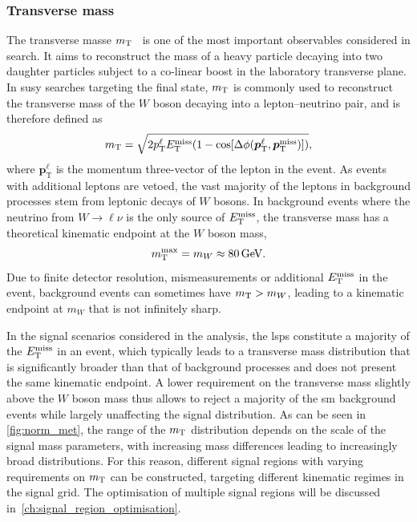 \subsubsection{Transverse mass}

The transverse masse $m_{\textrm{T}}$~\cite{Arnison:1983rp,transversemass:163856} is one of the most important observables considered in \onelepton search. It aims to reconstruct the mass of a heavy particle decaying into two daughter particles subject to a co-linear boost in the laboratory transverse plane. In \gls{susy} searches targeting the \onelepton final state, $m_{\textrm{T}}$ is commonly used to reconstruct the transverse mass of the $W$ boson decaying into a lepton--neutrino pair, and is therefore defined as
\begin{equation}
	m_{\textrm{T}} = \sqrt{2p_{\textrm{T}}^\ell E_{\textrm{T}}^{\textrm{miss}}(1-\cos[\Delta\phi(\boldsymbol{p}_\mathrm{T}^\ell,\boldsymbol{p}_\mathrm{T}^\mathrm{miss})])},
\end{equation}
where $\boldsymbol{p}_\mathrm{T}^\ell$ is the momentum three-vector of the lepton in the event. As events with additional leptons are vetoed, the vast majority of the leptons in background processes stem from leptonic decays of $W$ bosons. In background events where the neutrino from $W\rightarrow\ell\nu$ is the only source of $E_{\textrm{T}}^{\textrm{miss}}$, the transverse mass has a theoretical kinematic endpoint at the $W$ boson mass, 
\begin{equation}
	\mt^\mathrm{max} = m_W \approx \SI{80}{\GeV}.
\end{equation}
Due to finite detector resolution, mismeasurements or additional $E_{\textrm{T}}^{\textrm{miss}}$ in the event, background events can sometimes have $m_{\textrm{T}} > m_W$, leading to a kinematic endpoint at $m_W$ that is not infinitely sharp.

In the signal scenarios considered in the analysis, the \glspl{lsp} constitute a majority of the $E_{\textrm{T}}^{\textrm{miss}}$ in an event, which typically leads to a transverse mass distribution that is significantly broader than that of background processes and does not present the same kinematic endpoint. A lower requirement on the transverse mass slightly above the $W$ boson mass thus allows to reject a majority of the \gls{sm} background events while largely unaffecting the signal distribution. As can be seen in \cref{fig:norm_met}, the range of the $m_{\textrm{T}}$ distribution depends on the scale of the signal mass parameters, with increasing mass differences leading to increasingly broad distributions. For this reason, different signal regions with varying requirements on $m_{\textrm{T}}$ can be constructed, targeting different kinematic regimes in the signal grid. The optimisation of multiple signal regions will be discussed in~\cref{ch:signal_region_optimisation}.

